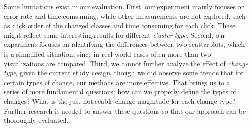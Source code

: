 Some limitations exist in our evaluation.
First, our experiment mainly focuses on error rate and time comsuming, while other measurements are not explored, such as click order of the changed classes and time consuming for each click. These might reflect some interesting results for different \emph{cluster type}.
Second, our experiment focuses on identifying the differences between two scatterplots, which is a simplified situation, since in real-world cases often more than two visualizations are compared.
Third, we cannot further analyze the effect of \emph{change type}, given the current study design, though we did observe some trends that for certain types of change, our methods are more effective.
That brings us to a series of more fundamental questions: how can we properly define the types of changes? What is the just noticeable change magnitude for each change type?
Further research is needed to answer these questions so that our approach can be thoroughly evaluated.
